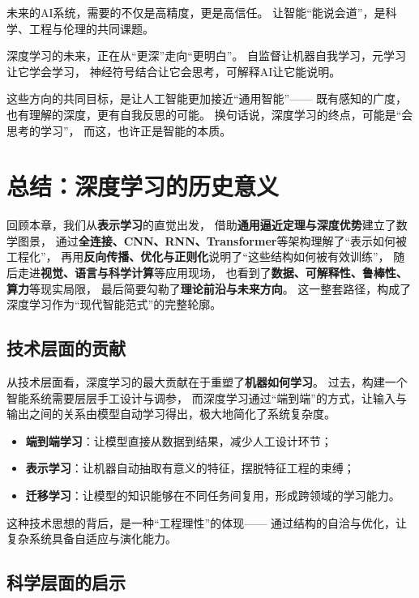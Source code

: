 未来的AI系统，需要的不仅是高精度，更是高信任。  
让智能“能说会道”，是科学、工程与伦理的共同课题。

深度学习的未来，正在从“更深”走向“更明白”。  
自监督让机器自我学习，元学习让它学会学习，  
神经符号结合让它会思考，可解释AI让它能说明。  

这些方向的共同目标，是让人工智能更加接近“通用智能”——  
既有感知的广度，也有理解的深度，更有自我反思的可能。  
换句话说，深度学习的终点，可能是“会思考的学习”，  
而这，也许正是智能的本质。

\section{总结：深度学习的历史意义}

回顾本章，我们从\textbf{表示学习}的直觉出发，  
借助\textbf{通用逼近定理与深度优势}建立了数学图景，  
通过\textbf{全连接、CNN、RNN、Transformer}等架构理解了“表示如何被工程化”，  
再用\textbf{反向传播、优化与正则化}说明了“这些结构如何被有效训练”，  
随后走进\textbf{视觉、语言与科学计算}等应用现场，  
也看到了\textbf{数据、可解释性、鲁棒性、算力}等现实局限，  
最后简要勾勒了\textbf{理论前沿与未来方向}。  
这一整套路径，构成了深度学习作为“现代智能范式”的完整轮廓。

\subsection{技术层面的贡献}

从技术层面看，深度学习的最大贡献在于重塑了\textbf{机器如何学习}。  
过去，构建一个智能系统需要层层手工设计与调参，  
而深度学习通过“端到端”的方式，让输入与输出之间的关系由模型自动学习得出，极大地简化了系统复杂度。  

\begin{itemize}
\item \textbf{端到端学习}：让模型直接从数据到结果，减少人工设计环节；
\item \textbf{表示学习}：让机器自动抽取有意义的特征，摆脱特征工程的束缚；
\item \textbf{迁移学习}：让模型的知识能够在不同任务间复用，形成跨领域的学习能力。
\end{itemize}

这种技术思想的背后，是一种“工程理性”的体现——  
通过结构的自洽与优化，让复杂系统具备自适应与演化能力。

\subsection{科学层面的启示}

